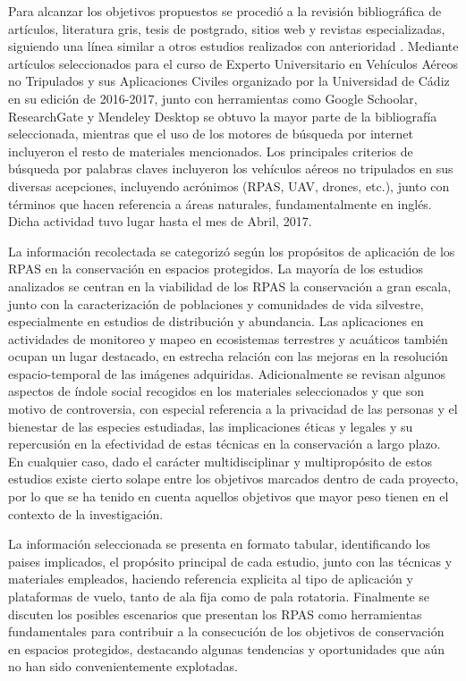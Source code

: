 \documentclass[11pt,]{article}
\begin{document}
Para alcanzar los objetivos propuestos se procedió a la revisión
bibliográfica de artículos, literatura gris, tesis de postgrado, sitios
web y revistas especializadas, siguiendo una línea similar a otros
estudios realizados con anterioridad \citet{Linchant2015}. Mediante
artículos seleccionados para el curso de Experto Universitario en
Vehículos Aéreos no Tripulados y sus Aplicaciones Civiles organizado por
la Universidad de Cádiz en su edición de 2016-2017, junto con
herramientas como Google Schoolar, ResearchGate y Mendeley Desktop se
obtuvo la mayor parte de la bibliografía seleccionada, mientras que el
uso de los motores de búsqueda por internet incluyeron el resto de
materiales mencionados. Los principales criterios de búsqueda por
palabras claves incluyeron los vehículos aéreos no tripulados en sus
diversas acepciones, incluyendo acrónimos (RPAS, UAV, drones, etc.),
junto con términos que hacen referencia a áreas naturales,
fundamentalmente en inglés. Dicha actividad tuvo lugar hasta el mes de
Abril, 2017.

La información recolectada se categorizó según los propósitos de
aplicación de los RPAS en la conservación en espacios protegidos. La
mayoría de los estudios analizados se centran en la viabilidad de los
RPAS la conservación a gran escala, junto con la caracterización de
poblaciones y comunidades de vida silvestre, especialmente en estudios
de distribución y abundancia. Las aplicaciones en actividades de
monitoreo y mapeo en ecosistemas terrestres y acuáticos también ocupan
un lugar destacado, en estrecha relación con las mejoras en la
resolución espacio-temporal de las imágenes adquiridas. Adicionalmente
se revisan algunos aspectos de índole social recogidos en los materiales
seleccionados y que son motivo de controversia, con especial referencia
a la privacidad de las personas y el bienestar de las especies
estudiadas, las implicaciones éticas y legales y su repercusión en la
efectividad de estas técnicas en la conservación a largo plazo. En
cualquier caso, dado el carácter multidisciplinar y multipropósito de
estos estudios existe cierto solape entre los objetivos marcados dentro
de cada proyecto, por lo que se ha tenido en cuenta aquellos objetivos
que mayor peso tienen en el contexto de la investigación.

La información seleccionada se presenta en formato tabular,
identificando los paises implicados, el propósito principal de cada
estudio, junto con las técnicas y materiales empleados, haciendo
referencia explicita al tipo de aplicación y plataformas de vuelo, tanto
de ala fija como de pala rotatoria. Finalmente se discuten los posibles
escenarios que presentan los RPAS como herramientas fundamentales para
contribuir a la consecución de los objetivos de conservación en espacios
protegidos, destacando algunas tendencias y oportunidades que aún no han
sido convenientemente explotadas.
\end{document}
